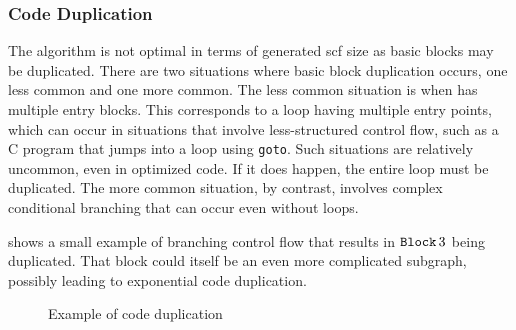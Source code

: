 \subsubsection{Code Duplication}\label{sse:code_dup}
The algorithm is not optimal in terms of generated \ac{scf} size
as basic blocks may be duplicated.
There are two situations where basic block duplication occurs,
one less common and one more common.
The less common situation is when  has multiple entry blocks.
This corresponds to a loop having multiple entry points,
which can occur in situations that involve less-structured control flow,
such as a C program that jumps into a loop using \texttt{goto}.
Such situations are relatively uncommon, even in optimized code.
If it does happen, the entire loop must be duplicated.
The more common situation, by contrast, involves complex conditional branching
that can occur even without loops.
\begin{example}
   shows a small example of branching control flow
  that results in $\operatorname{\mathtt{Block}} 3$ being duplicated.
  That block could itself be an even more complicated subgraph,
  possibly leading to exponential code duplication.
\end{example}
\begin{figure}
  \hspace*{\fill}
  \hfill
  \hspace*{\fill}
  \caption{Example of code duplication}\label{fig:ex_nonopt}
\end{figure}

